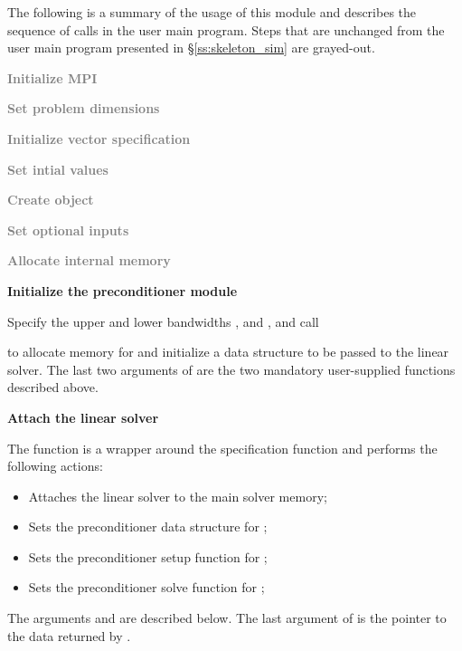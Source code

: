 The following is a summary of the usage of this module and describes the sequence 
of calls in the user main program. Steps that are unchanged from the user main
program presented in \S\ref{ss:skeleton_sim} are grayed-out.
\begin{Steps}
\item 
  \textcolor{gray}{\bf Initialize MPI}

\item
  \textcolor{gray}{\bf Set problem dimensions}

\item
  \textcolor{gray}{\bf Initialize vector specification}

\item
  \textcolor{gray}{\bf Set intial values}
 
\item
  \textcolor{gray}{\bf Create {\cvodes} object}

\item
  \textcolor{gray}{\bf Set optional inputs}

\item
  \textcolor{gray}{\bf Allocate internal memory}

\item \label{i:bbdpre_init}
  {\bf Initialize the {\cvbbdpre} preconditioner module}

  Specify the upper and lower bandwidths ,  and
  ,  and call 


  to allocate memory for and initialize a data structure  to be 
  passed to the {\cvspgmr} linear solver. The last two arguments of 
  are the two mandatory user-supplied functions described above.

\item \label{i:bbdpre_attach}
  {\bf Attach the {\cvspgmr} linear solver}


  The function  is a wrapper around the {\cvspgmr} specification
  function  and performs the following actions:
  \begin{itemize}
    \item Attaches the {\cvspgmr} linear solver to the main {\cvodes} solver memory;
    \item Sets the preconditioner data structure for {\cvbbdpre};
    \item Sets the preconditioner setup function for {\cvbbdpre};
    \item Sets the preconditioner solve function for {\cvbbdpre};
  \end{itemize}
  The arguments  and  are described below.
  The last argument of  is the pointer to the {\cvbbdpre} data
  returned by .


\end{Steps}
